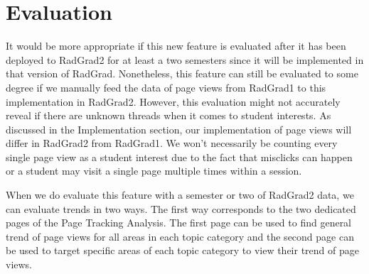 \documentclass[english]{proposalnsf}
\begin{document}
  \section{Evaluation}
  \label{sec:evaluation}
  It would be more appropriate if this new feature is evaluated after it has been deployed to RadGrad2 for at least a
  two semesters since it will be implemented in that version of RadGrad. Nonetheless, this feature can still be
  evaluated to some degree if we manually feed the data of page views from RadGrad1 to this implementation in RadGrad2.
  However, this evaluation might not accurately reveal if there are unknown threads when it comes to student interests.
  As discussed in the Implementation section, our implementation of page views will differ in RadGrad2 from RadGrad1. We
  won't necessarily be counting every single page view as a student interest due to the fact that misclicks can happen or
  a student may visit a single page multiple times within a session.

  When we do evaluate this feature with a semester or two of RadGrad2 data, we can evaluate trends in two ways. The first
  way corresponds to the two dedicated pages of the Page Tracking Analysis. The first page can be used to find general
  trend of page views for all areas in each topic category and the second page can be used to target specific areas of
  each topic category to view their trend of page views.
\end{document}
